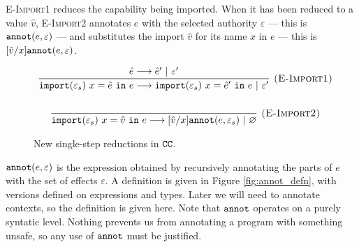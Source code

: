 \textsc{E-Import1} reduces the capability being imported. When it has been
reduced to a value $\hat v$, \textsc{E-Import2} annotates $e$ with the selected
authority $\varepsilon$ --- this is $\mathtt{annot}(e, \varepsilon)$ --- and
substitutes the import $\hat v$ for its name $x$ in $e$ --- this is
$[\hat v/x]\mathtt{annot}(e, \varepsilon)$.

\begin{figure}


\[
\begin{array}{c}
\infer[\textsc{(E-Import1)}]
	{\kwa{import}(\varepsilon_s)~x = \hat e~\kw{in} e \longrightarrow \kwa{import}(\varepsilon_s)~x = \hat e'~\kw{in} e~|~\varepsilon'}
	{\hat e \longrightarrow \hat e'~|~\varepsilon'}\\[4ex]

\infer[\textsc{(E-Import2)}]
	{\kwa{import}(\varepsilon_s)~x = \hat v~\kw{in} e \longrightarrow [\hat v/x]\kwa{annot}(e, \varepsilon_s)~|~\varnothing}
	{}

\end{array}
\]
\caption{New single-step reductions in $\mathtt{CC}$.}
\label{fig:epscalc_reductions}
\end{figure}

$\mathtt{annot}(e, \varepsilon)$ is the expression obtained by
recursively annotating the parts of $e$ with the set of effects
$\varepsilon$. A definition is given in Figure
\ref{fig:annot_defn}, with versions defined on expressions and types.
 Later we will need to annotate contexts, so
the definition is given here. Note that
$\mathtt{annot}$ operates on a purely syntatic level. Nothing prevents
us from annotating a program with something unsafe, so any use of
$\mathtt{annot}$ must be justified.


